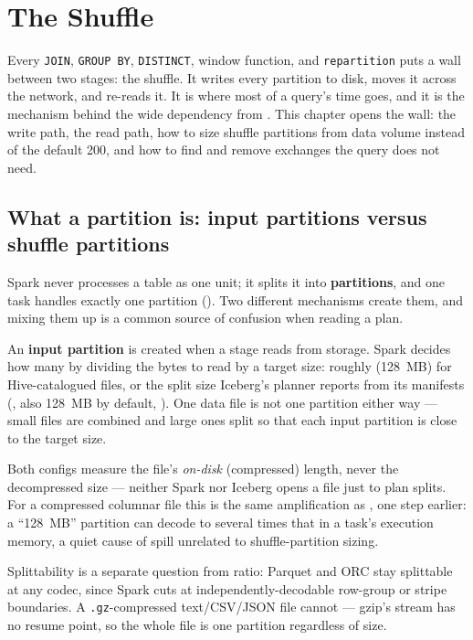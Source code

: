 \chapter{The Shuffle}
\label{ch:shuffle}

\begin{chapterintro}
Every \texttt{JOIN}, \texttt{GROUP BY}, \texttt{DISTINCT}, window function, and
\texttt{repartition} puts a wall between two stages: the shuffle. It writes
every partition to disk, moves it across the network, and re-reads it. It is
where most of a query's time goes, and it is the mechanism behind the wide
dependency from . This chapter opens the wall: the write
path, the read path, how to size shuffle partitions from data volume instead of
the default 200, and how to find and remove exchanges the query does not need.
\end{chapterintro}

\section{What a partition is: input partitions versus shuffle partitions}
\label{sec:shuffle-partition}

Spark never processes a table as one unit; it splits it into
\textbf{partitions}, and one task handles exactly one partition
(). Two different mechanisms create them, and mixing them
up is a common source of confusion when reading a plan.

An \textbf{input partition} is created when a stage reads from storage. Spark
decides how many by dividing the bytes to read by a target size: roughly
 (128~MB) for Hive-catalogued files, or
the split size Iceberg's planner reports from its manifests
(, also 128~MB by default, ).
One data file is not one partition either way --- small files are combined and
large ones split so that each input partition is close to the target size.

\begin{note}
Both configs measure the file's \emph{on-disk} (compressed) length, never the
decompressed size --- neither Spark nor Iceberg opens a file just to plan
splits. For a compressed columnar file this is the same amplification as
, one step earlier: a ``128~MB'' partition can decode to
several times that in a task's execution memory, a quiet cause of spill
unrelated to shuffle-partition sizing.

Splittability is a separate question from ratio: Parquet and ORC stay
splittable at any codec, since Spark cuts at independently-decodable row-group
or stripe boundaries. A \texttt{.gz}-compressed text/CSV/JSON file cannot ---
gzip's stream has no resume point, so the whole file is one partition
regardless of size.
\end{note}

